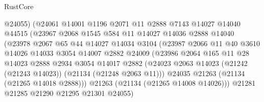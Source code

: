 \begin{lexlean}{RustCore}
\begin{coremodule}
                            @24055)
                          (@24061
                            @14001
                            @1196
                            @2071
                            @11
                            @2888
                            @7143
                            @14027
                            @14040
                            @44515
                            (@23967
                              @2068
                              @1545
                              @584
                              @11
                              @14027
                              @14036
                              @2888
                              @14040
                              (@23978
                                @2067
                                @65
                                @44
                                @14027
                                @14034
                                @3104
                                (@23987
                                  @2066
                                  @11
                                  @40
                                  @3610
                                  @14026
                                  @14033
                                  @3054
                                  @14007
                                  @2882
                                  @24009
                                  (@23986
                                    @2064
                                    @165
                                    @11
                                    @28
                                    @14023
                                    @2888
                                    @2934
                                    @3054
                                    @14017
                                    @2882
                                    (@24023
                                      @2063
                                      @14023
                                      (@21242 (@21243 @14023))
                                      (@21134 (@21248 @2063 @11)))
                                    @24035
                                    @21263
                                    (@21134 (@21265 @14018 @2888)))
                                  @21263
                                  (@21134 (@21265 @14008 @14026)))
                                @21281
                                @21285
                                @21290
                                @21295
                                @21301
                                @24055)

\end{coremodule}
\end{lexlean}
